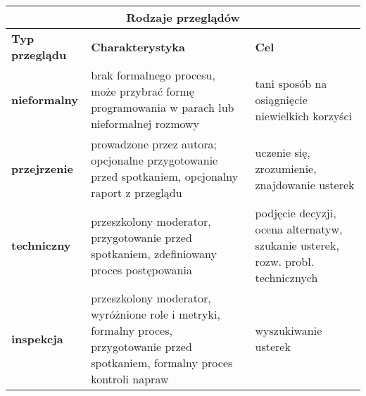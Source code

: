 \documentclass[../main.tex]{subfiles}
\begin{document}
    \begin{table}[H]
        \begin{center}
            \begin{tabular}{|p{3cm}||p{8cm}|p{5cm}|}
                \hline
                \multicolumn{3}{|c|}{ \textbf{Rodzaje przeglądów}}\\
                \hline
                \textbf{Typ przeglądu} & \textbf{Charakterystyka} & \textbf{Cel}\\
                \hline
                \hline
                \textbf{nieformalny} & brak formalnego procesu, może przybrać formę programowania w parach lub nieformalnej rozmowy &
                tani sposób na osiągnięcie niewielkich korzyści\\
                \hline
                \textbf{przejrzenie} & prowadzone przez autora; opcjonalne przygotowanie przed spotkaniem,
                opcjonalny raport z przeglądu & uczenie się, zrozumienie, znajdowanie usterek\\
                \hline
                \textbf{techniczny} & przeszkolony moderator, przygotowanie przed spotkaniem, zdefiniowany proces
                postępowania & podjęcie decyzji, ocena alternatyw, szukanie usterek, rozw. probl. technicznych\\
                \hline
                \textbf{inspekcja} & przeszkolony moderator, wyróżnione role i metryki, formalny proces, przygotowanie przed
                spotkaniem, formalny proces kontroli napraw & wyszukiwanie usterek\\
                \hline
            \end{tabular}
        \end{center}
    \end{table}
\end{document}
